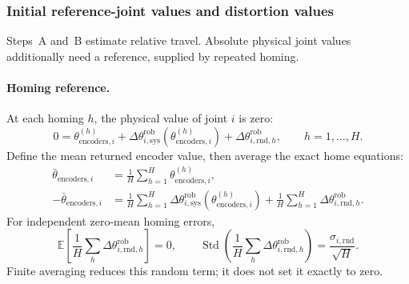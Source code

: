 \documentclass[../main.tex]{subfiles}
\begin{document}
\subsubsection{Initial reference-joint values and distortion values}\label{sec:math-travel}
Steps~A and~B estimate relative travel. Absolute physical joint values additionally need a reference, supplied by repeated homing.

\paragraph{Homing reference.}
At each homing $h$, the physical value of joint $i$ is zero:
\begin{equation*}
0=\theta_{\mathrm{encoders},i}^{(h)}
+\Delta\theta^{\mathrm{rob}}_{i,\mathrm{sys}}(\theta_{\mathrm{encoders},i}^{(h)})
+\Delta\theta^{\mathrm{rob}}_{i,\mathrm{rnd},h},\qquad h=1,\ldots,H.
\end{equation*}
Define the mean returned encoder value, then average the exact home equations:
\begin{equation*}
\begin{aligned}
\bar\theta_{\mathrm{encoders},i}
&=\frac1H\sum_{h=1}^{H}\theta_{\mathrm{encoders},i}^{(h)},\\
-\bar\theta_{\mathrm{encoders},i}
&=\frac1H\sum_{h=1}^{H}\Delta\theta^{\mathrm{rob}}_{i,\mathrm{sys}}(\theta_{\mathrm{encoders},i}^{(h)})
+\frac1H\sum_{h=1}^{H}\Delta\theta^{\mathrm{rob}}_{i,\mathrm{rnd},h}.
\end{aligned}
\end{equation*}
For independent zero-mean homing errors,
\begin{equation*}
\mathbb E\!\left[\frac1H\sum_h\Delta\theta^{\mathrm{rob}}_{i,\mathrm{rnd},h}\right]=0,\qquad
\operatorname{Std}\!\left(\frac1H\sum_h\Delta\theta^{\mathrm{rob}}_{i,\mathrm{rnd},h}\right)
=\frac{\sigma_{i,\mathrm{rnd}}}{\sqrt H}.
\end{equation*}
Finite averaging reduces this random term; it does not set it exactly to zero.
\end{document}
